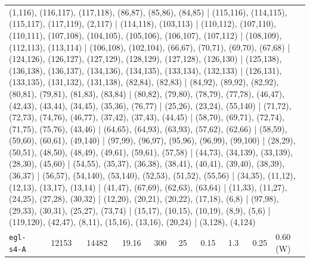 \begin{longtable}{lrrrrrrrrl}
\multicolumn{10}{p{0.96\linewidth}}{\tiny\raggedright\arraybackslash (1,116), (116,117), (117,118), (86,87), (85,86), (84,85) | (115,116), (114,115), (115,117), (117,119), (2,117) | (114,118), (103,113) | (110,112), (107,110), (110,111), (107,108), (104,105), (105,106), (106,107), (107,112) | (108,109), (112,113), (113,114) | (106,108), (102,104), (66,67), (70,71), (69,70), (67,68) | (124,126), (126,127), (127,129), (128,129), (127,128), (126,130) | (125,138), (136,138), (136,137), (134,136), (134,135), (133,134), (132,133) | (126,131), (133,135), (131,132), (131,138), (82,84), (82,83) | (84,92), (89,92), (82,92), (80,81), (79,81), (81,83), (83,84) | (80,82), (79,80), (78,79), (77,78), (46,47), (42,43), (43,44), (34,45), (35,36), (76,77) | (25,26), (23,24), (55,140) | (71,72), (72,73), (74,76), (46,77), (37,42), (37,43), (44,45) | (58,70), (69,71), (72,74), (71,75), (75,76), (43,46) | (64,65), (64,93), (63,93), (57,62), (62,66) | (58,59), (59,60), (60,61), (49,140) | (97,99), (96,97), (95,96), (96,99), (99,100) | (28,29), (50,51), (48,50), (48,49), (49,61), (59,61), (57,58) | (44,73), (34,139), (33,139), (28,30), (45,60) | (54,55), (35,37), (36,38), (38,41), (40,41), (39,40), (38,39), (36,37) | (56,57), (54,140), (53,140), (52,53), (51,52), (55,56) | (34,35), (11,12), (12,13), (13,17), (13,14) | (41,47), (67,69), (62,63), (63,64) | (11,33), (11,27), (24,25), (27,28), (30,32) | (12,20), (20,21), (20,22), (17,18), (6,8) | (97,98), (29,33), (30,31), (25,27), (73,74) | (15,17), (10,15), (10,19), (8,9), (5,6) | (119,120), (42,47), (8,11), (15,16), (13,16), (20,24) | (3,128), (4,124)} \\[2pt]
\texttt{egl-s4-A} & 12153 & 14482 & 19.16 & 300 & 25 & 0.15 & 1.3 & 0.25 & 0.60\,(W) \\

\end{longtable}
